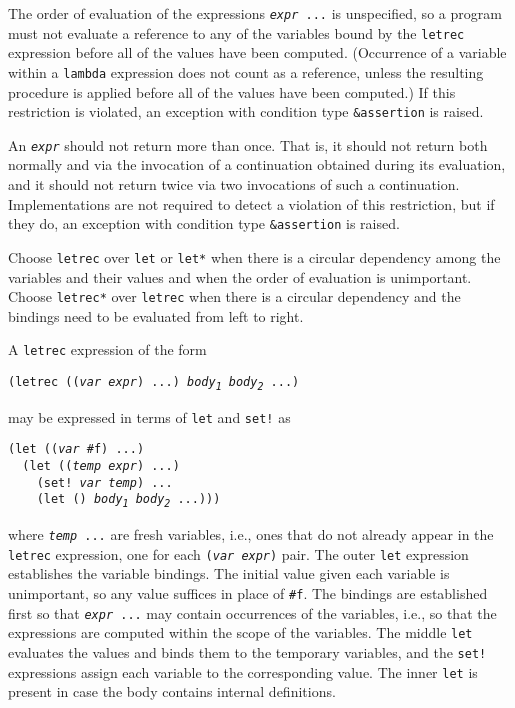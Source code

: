 The order of evaluation of the expressions
\texttt{\textit{expr} ...} is unspecified, so a program must not
evaluate a reference
to any of the variables bound by the \texttt{letrec} expression before
all of the values have been computed.
(Occurrence of a variable within a \texttt{lambda} expression does
not count as a reference, unless the resulting procedure is applied
before all of the values have been computed.)
If this restriction is violated, an exception with condition type
\texttt{\&{}assertion} is raised.


An \texttt{\textit{expr}} should not return more than once.
That is, it should not return both normally and via the invocation of a
continuation obtained during its evaluation, and it should not return
twice via two invocations of such a continuation.
Implementations are not required to detect a violation of this restriction,
but if they do, an exception with condition type \texttt{\&{}assertion} is
raised.


Choose \texttt{letrec} over \texttt{let} or \texttt{let*} when there is a
circular dependency among the variables and their values and
when the order of evaluation is unimportant.
Choose \texttt{letrec*} over \texttt{letrec} when there is a circular
dependency and the bindings need to be evaluated from left to right.


A \texttt{letrec} expression of the form


\texttt{(letrec ((\textit{var} \textit{expr}) ...) \textit{body\textsubscript{1}} \textit{body\textsubscript{2}} ...)}

may be expressed in terms of \texttt{let} and \texttt{set!} as


\begin{alltt}
(let ((\textit{var} \#{}f) ...)
  (let ((\textit{temp} \textit{expr}) ...)
    (set! \textit{var} \textit{temp}) ...
    (let () \textit{body\textsubscript{1}} \textit{body\textsubscript{2}} ...)))
\end{alltt}


where \texttt{\textit{temp} ...} are fresh variables, i.e., ones
that do not already appear in the \texttt{letrec} expression,
one for each \texttt{(\textit{var} \textit{expr})} pair.
The outer \texttt{let} expression establishes the variable bindings.
The initial value given each variable is unimportant, so any value
suffices in place of \texttt{\#{}f}.
The bindings are established first so that \texttt{\textit{expr} ...}
may contain
occurrences of the variables, i.e., so that the expressions are computed
within the scope of the variables.
The middle \texttt{let} evaluates the values and binds them to the temporary
variables, and the \texttt{set!} expressions assign each variable
to the corresponding value.
The inner \texttt{let} is present in case the body contains internal
definitions.


